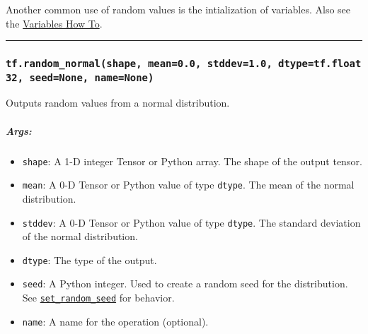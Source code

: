 Another common use of random values is the intialization of variables.
Also see the \href{../../how_tos/variables/index.md}{Variables How To}.

\begin{Shaded}
\begin{Highlighting}[]
\CommentTok{# Use random uniform values in [0, 1) as the initializer for a variable of shape}
\OperatorTok{=} \NormalTok{tf.Variable(tf.random_uniform([}\NormalTok{, }\NormalTok{]), name}\OperatorTok{=}\NormalTok{)}
\OperatorTok{=} 

\OperatorTok{=} 
 
\end{Highlighting}
\end{Shaded}

\begin{center}\rule{0.5\linewidth}{\linethickness}\end{center}

\subsubsection{\texorpdfstring{\texttt{tf.random\_normal(shape,\ mean=0.0,\ stddev=1.0,\ dtype=tf.float32,\ seed=None,\ name=None)}
}{tf.random\_normal(shape, mean=0.0, stddev=1.0, dtype=tf.float32, seed=None, name=None) }}\label{tf.randomux5fnormalshape-mean0.0-stddev1.0-dtypetf.float32-seednone-namenone}

Outputs random values from a normal distribution.

\subparagraph{Args: }\label{args-8}

\begin{itemize}
\tightlist
\item
  \texttt{shape}: A 1-D integer Tensor or Python array. The shape of the
  output tensor.
\item
  \texttt{mean}: A 0-D Tensor or Python value of type \texttt{dtype}.
  The mean of the normal distribution.
\item
  \texttt{stddev}: A 0-D Tensor or Python value of type \texttt{dtype}.
  The standard deviation of the normal distribution.
\item
  \texttt{dtype}: The type of the output.
\item
  \texttt{seed}: A Python integer. Used to create a random seed for the
  distribution. See
  \href{../../api_docs/python/constant_op.md\#set_random_seed}{\texttt{set\_random\_seed}}
  for behavior.
\item
  \texttt{name}: A name for the operation (optional).
\end{itemize}

